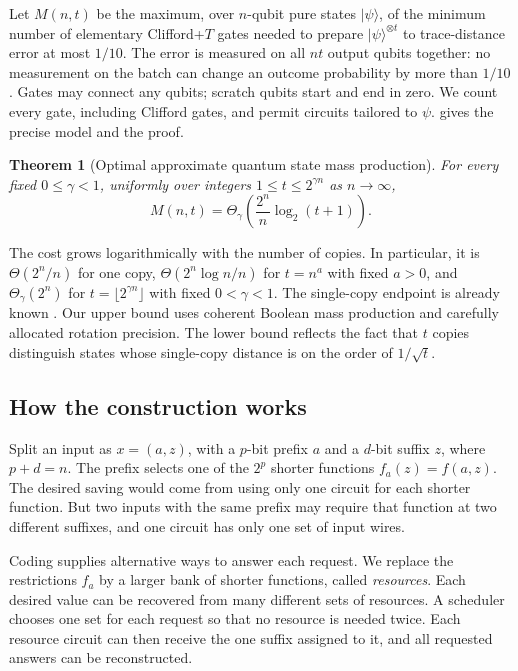 \documentclass[11pt]{article}
\newtheorem{theorem}{Theorem}[section]
\begin{document}
Let $M(n,t)$ be the maximum, over $n$-qubit pure states $|\psi\rangle$,
of the minimum number of elementary Clifford+$T$ gates needed to prepare
$|\psi\rangle^{\otimes t}$ to trace-distance error at most $1/10$.
The error is measured on all $nt$ output qubits together: no measurement
on the batch can change an outcome probability by more than $1/10$.
Gates may connect any qubits; scratch qubits start and end in zero.  We count every gate,
including Clifford gates, and permit circuits tailored to $\psi$.
 gives the precise model and the proof.

\begin{theorem}[Optimal approximate quantum state mass production]
\label{thm:quantum}
For every fixed $0\le\gamma<1$, uniformly over integers
$1\le t\le2^{\gamma n}$ as $n\to\infty$,
\[
  M(n,t)=\Theta_\gamma\!\left(\frac{2^n}{n}\log_2(t+1)\right).
\]
\end{theorem}

The cost grows logarithmically with the number of copies.  In particular,
it is $\Theta(2^n/n)$ for one copy, $\Theta(2^n\log n/n)$ for
$t=n^a$ with fixed $a>0$, and $\Theta_\gamma(2^n)$ for
$t=\lfloor2^{\gamma n}\rfloor$ with fixed $0<\gamma<1$.
The single-copy endpoint is already known \cite{GossetKothariWu2026}.
Our upper bound uses coherent Boolean mass production and carefully
allocated rotation precision.  The lower bound reflects the fact that
$t$ copies distinguish states whose single-copy distance is on the order
of $1/\sqrt t$.

\subsection{How the construction works}

Split an input as $x=(a,z)$, with a $p$-bit prefix $a$ and a $d$-bit suffix
$z$, where $p+d=n$.  The prefix selects one of the $2^p$ shorter functions
$f_a(z)=f(a,z)$.  The desired saving would come from using only one circuit
for each shorter function.  But two inputs with the same prefix may require
that function at two different suffixes, and one circuit has only one set of
input wires.

Coding supplies alternative ways to answer each request.  We replace the
restrictions $f_a$ by a larger bank of shorter functions, called
\emph{resources}.  Each desired value can be recovered from many different
sets of resources.  A scheduler chooses one set for each request so that no
resource is needed twice.  Each resource circuit can then receive the one
suffix assigned to it, and all requested answers can be reconstructed.
\end{document}
